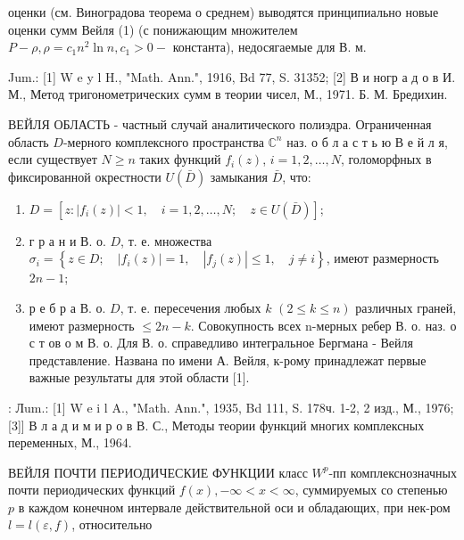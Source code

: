 \documentclass[10pt]{article}
\begin{document}
оценки (см. Виноградова теорема о среднем) выводятся принципиально новые оценки сумм Вейля (1) (с понижающим множителем $P-\rho, \rho=c_{1} n^{2} \ln n, c_{1}>0-$ константа), недосягаемые для В. м.



Jum.: [1] W e y l H., "Math. Ann.", 1916, Bd 77, S. 31352; [2] В и ногр а д о в И. М., Метод тригонометрических сумм в теории чисел, М., 1971. Б. М. Бредихин.



ВЕЙЛЯ ОБЛАСТЬ - частный случай аналитического полиэдра. Ограниченная область $D$-мерного комплексного пространства $\mathbb{C}^{n}$ наз. о б л а с т ь ю В е й л я, если существует $N \geqslant n$ таких функций $f_{i}(z)$, $i=1,2, \ldots, N$, голоморфных в фиксированной окрестности $U(\bar{D})$ замыкания $\bar{D}$, что:



\begin{enumerate}

  \item $D=\left[z:\left|f_{i}(z)\right|<1, \quad i=1,2, \ldots, N ; \quad z \in U(\bar{D})\right]$;



  \item г р а н и В. о. $D$, т. е. множества $\sigma_{i}=\left\{z \in D ; \quad\left|f_{i}(z)\right|=1, \quad\left|f_{j}(z)\right| \leqslant 1, \quad j \neq i\right\}$, имеют размерность $2 n-1$;



  \item р е б р а В. о. $D$, т. е. пересечения любых $k$ $(2 \leqslant k \leqslant n)$ различных граней, имеют размерность $\leqslant 2 n-k$. Совокупность всех n-мерных ребер В. о. наз. о с т ов о м В. о. Для В. о. справедливо интегральное Бергмана - Вейля представление. Названа по имени А. Вейля, к-рому принадлежат первые важные результаты для этой области [1].



\end{enumerate}



: Лum.: [1] W e i l A., "Math. Ann.", 1935, Bd 111, S. 178ч. 1-2, 2 изд., М., 1976; [3]] В л а д и м и р о в В. С., Методы теории функций многих комплексных переменных, М., 1964.



ВЕЙЛЯ ПОЧТИ ПЕРИОДИЧЕСКИЕ ФУНКЦИИ класс $W^{p}$-пп комплекснозначных почти периодических функций $f(x),-\infty<x<\infty$, суммируемых со степенью $p$ в каждом конечном интервале действительной оси и обладающих, при нек-ром $l=l(\varepsilon, f)$, относительно
\end{document}
